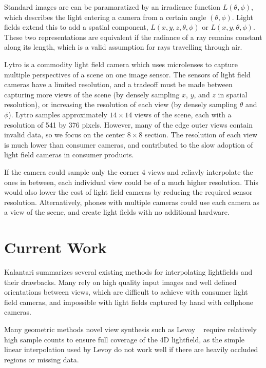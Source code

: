 \documentclass[10pt,twocolumn,letterpaper]{article}
\begin{document}
Standard images are can be paramaratized by an irradience function $L(\theta, \phi)$, which
describes the light entering a camera from a certain angle $(\theta, \phi)$. Light fields
extend this to add a spatial component, $L(x, y, z, \theta, \phi)$ or $L(x, y, \theta, \phi)$. 
These two representations are equivalent if the radiance of a ray remains constant along its length,
which is a valid assumption for rays travelling through air.

Lytro is a commodity light field camera which uses microlenses to capture multiple
perspectives of a scene on one image sensor. The sensors of light field cameras have a 
limited resolution, and a tradeoff must be made between capturing more views of the scene 
(by densely sampling $x$, $y$, and $z$ in spatial resolution), or increasing the resolution of each view 
(by densely sampling $\theta$ and $\phi$). 
Lytro samples approximately $14 \times 14$ views of the scene, each with a resolution of 541 by 376 pixels.
However, many of the edge outer views contain invalid data, so we focus on the center $8 \times 8$ section.
The resolution of each view is much lower than consumer cameras, 
and contributed to the slow adoption of light field cameras in consumer products.

If the camera could sample only the corner 4 views and reliavly interpolate the ones in between, each individual view
could be of a much higher resolution. This would also lower the cost of light field cameras by reducing the required
sensor resolution. Alternatively, phones with multiple cameras could use each camera as a 
view of the scene, and create light fields with no additional hardware. 

\section{Current Work}

Kalantari summarizes several existing methods for interpolating lightfields and their drawbacks.
Many rely on high quality input images and well defined orientations between views,
which are difficult to achieve with consumer light field cameras, and impossible with light fields
captured by hand with cellphone cameras.

Many geometric methods novel view synthesis 
such as Levoy \etal~\cite{levoy1996light} require relatively high sample counts to ensure full
coverage of the 4D lightfield, as the simple linear interpolation used by Levoy
do not work well if there are heavily occluded regions or missing data.
\end{document}
